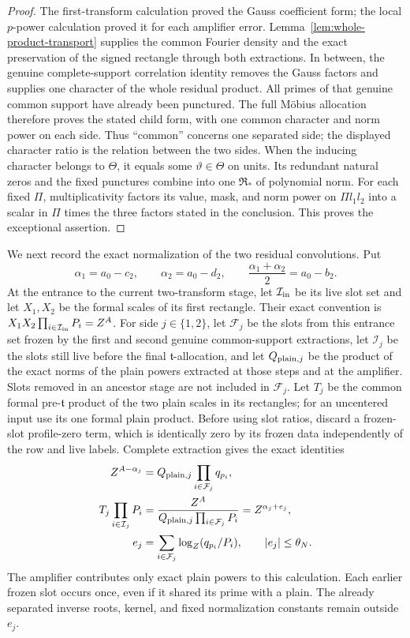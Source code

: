 \documentclass[12pt]{article}
\begin{document}
\begin{proof}
The first-transform calculation proved the Gauss coefficient form; the
local \(p\)-power calculation proved it for each amplifier error.
Lemma~\ref{lem:whole-product-transport} supplies the common Fourier
density and the exact preservation of the signed rectangle through
both extractions.  In between, the genuine complete-support
correlation identity removes the Gauss factors and supplies one
character of the whole residual product.  All primes of that
genuine common support have already been punctured.  The full
M\"obius allocation therefore proves the stated child form, with
one common character and norm power on each side.  Thus ``common'' concerns one separated side;
the displayed character ratio is the relation between the two sides.
When the inducing character belongs to \(\Theta\), it equals some
\(\vartheta\in\Theta\) on units.  Its redundant natural zeros and
the fixed punctures combine into one \(\mathfrak R_*\) of polynomial
norm.  For each fixed \(\Pi\), multiplicativity factors its value,
mask, and norm power on \(\Pi l_1l_2\) into a scalar in \(\Pi\)
times the three factors stated in the conclusion.  This proves the exceptional assertion.
\end{proof}

We next record the exact normalization of the two residual convolutions.  Put
\[
 \alpha_1=a_0-c_2,\qquad \alpha_2=a_0-d_2,\qquad
 \frac{\alpha_1+\alpha_2}{2}=a_0-b_2.
\]
At the entrance to the current two-transform stage, let
\(\mathcal I_{\rm in}\) be its live slot set and let \(X_1,X_2\)
be the formal scales of its first rectangle.  Their exact convention is
\(X_1X_2\prod_{i\in\mathcal I_{\rm in}}P_i=Z^A\).
For side \(j\in\{1,2\}\), let \(\mathcal F_j\) be the slots from this
entrance set frozen by the first and second genuine common-support
extractions, let \(\mathcal I_j\) be the slots still live before the
final \(\mathfrak t\)-allocation, and let \(Q_{{\rm plain},j}\) be
the product of the exact norms of the plain powers extracted at those
steps and at the amplifier.  Slots removed in an ancestor stage are not
included in \(\mathcal F_j\).  Let \(T_j\) be the common formal
pre-\(\mathfrak t\) product of the two plain scales in its rectangles;
for an uncentered input use its one formal plain product.  Before using
slot ratios, discard a frozen-slot profile-zero term, which is identically
zero by its frozen data independently of the row and live labels.
Complete extraction gives the exact identities
\[
 \begin{aligned}
 Z^{A-\alpha_j}
   &=Q_{{\rm plain},j}\prod_{i\in\mathcal F_j}q_{p_i},\\
 T_j\prod_{i\in\mathcal I_j}P_i
   &=\frac{Z^A}{Q_{{\rm plain},j}\prod_{i\in\mathcal F_j}P_i}
     =Z^{\alpha_j+e_j},\\
 e_j&=\sum_{i\in\mathcal F_j}\log_Z(q_{p_i}/P_i),
 \qquad |e_j|\le\theta_N.
 \end{aligned}
\]
The amplifier contributes only exact plain powers to this calculation.
Each earlier frozen slot occurs once, even if it shared its prime with
a plain.  The already separated inverse roots, kernel, and fixed
normalization constants remain outside \(e_j\).
\end{document}

